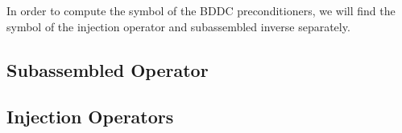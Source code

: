 In order to compute the symbol of the BDDC preconditioners, we will find the symbol of the injection operator and subassembled inverse separately.

\subsection{Subassembled Operator}


\subsection{Injection Operators}

